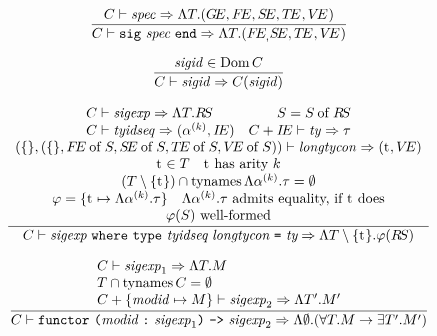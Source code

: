 %
%
\begin{equation}		%
\label{specsigexp-rule}
\frac{\C\ts\spec\ra\LAMBDA{\T}{\longenv}}
     {\C\ts\specsigexp\ra\sig{\T}{\longstr}}\index{41.2}
\end{equation}

\begin{equation}		%
\label{sigid-rule}
\frac{\sigid\in\Dom\C}
     { \C\ts\sigid\ra\C(\sigid)}
\end{equation}

\begin{equation}		%
\label{wheresigexp-rule}
\frac{\begin{array}{c}
      \begin{array}{lr}
        \C\ts\sigexp\ra\sig{\T}{\RS} &
	\S = \of{\S}{\RS} \\	
        \C\ts\tyidseq\ra( \alphak, \IE) &
        \C+\IE\ts\ty\ra\tau 
      \end{array} \\
        (\emptymap,(\emptymap,\of{\FE}{\S},\of{\SE}{\S},\of{\TE}{\S},\of{\VE}{\S}))
          \ts\longtycon\ra(\t,{\VE}) \\
      \begin{array}{lr} \t \in \T &  \mbox{\t\ has arity \k} \end{array}\\
      (\T \setminus \{\t\}) \cap \TyNamesFcn \typetypefnc{\alphak}{\tau} = \emptyset\\
      \begin{array}{lr}
        \tyrea = \{ \t \mapsto \typetypefnc{\alphak}{\tau}\} &
        \mbox{\typetypefnc{\alphak}{\tau}\ admits equality, if \t\ does} 
      \end{array} \\
      \mbox{$\tyrea(\S)$ well-formed}
      \end{array}
      }
     { \C\ts\wheresigexp\ra\sig{\T\setminus\{\t\}}{\tyrea(\RS)}}
\end{equation}

\begin{equation}		%
\label{opfunsigexp-rule}
\frac{\begin{array}{l}
      \C\ts\sigexp_1\ra\sig{\T}{\M} \\
      \T \cap \TyNamesFcn \C = \emptyset  \\
      \C+\{\modid\mapsto\M\}\ts\sigexp_2\ra\sig{\T'}{\M'} \\
      \end{array}
     }
     {\C\ts\opfunsigexp\ra\sig{\emptyset}{(\fun{\T}{\M}{\exmod{\T'}{\M'}})}}
\end{equation}

